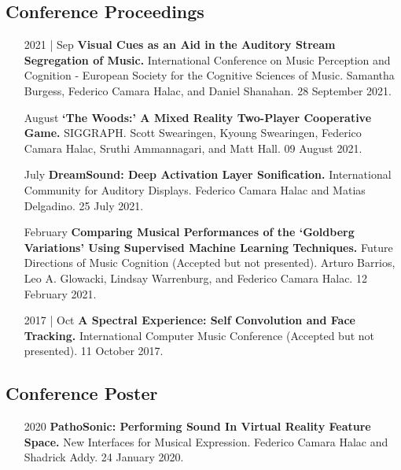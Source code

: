 \documentclass[12pt]{article}%
\begin{document}
\subsection{Conference Proceedings}%
\begin{itemize}[align=parleft,leftmargin=2.25cm,labelwidth=2cm]
\item[2021 | Sep]
\textbf{Visual Cues as an Aid in the Auditory Stream Segregation of Music.}
International Conference on Music Perception and Cognition {-} European Society for the Cognitive Sciences of Music. 
Samantha Burgess, Federico Camara Halac, and Daniel Shanahan. 
28 September 2021.
\end{itemize}%
\begin{itemize}[align=parleft,leftmargin=2.25cm,labelwidth=2cm]
\item[August]
\textbf{`The Woods:' A Mixed Reality Two{-}Player Cooperative Game.}
SIGGRAPH. 
Scott Swearingen, Kyoung Swearingen, Federico Camara Halac, Sruthi Ammannagari, and Matt Hall. 
09 August 2021.
\end{itemize}%
\begin{itemize}[align=parleft,leftmargin=2.25cm,labelwidth=2cm]
\item[July]
\textbf{DreamSound: Deep Activation Layer Sonification.}
International Community for Auditory Displays. 
Federico Camara Halac and Matias Delgadino. 
25 July 2021.
\end{itemize}%
\begin{itemize}[align=parleft,leftmargin=2.25cm,labelwidth=2cm]
\item[February]
\textbf{Comparing Musical Performances of the `Goldberg Variations' Using Supervised Machine Learning Techniques.}
Future Directions of Music Cognition (Accepted but not presented). 
Arturo Barrios, Leo A. Glowacki, Lindsay Warrenburg, and Federico Camara Halac. 
12 February 2021.
\end{itemize}%
\begin{itemize}[align=parleft,leftmargin=2.25cm,labelwidth=2cm]
\item[2017 | Oct]
\textbf{A Spectral Experience: Self Convolution and Face Tracking.}
International Computer Music Conference (Accepted but not presented). 
11 October 2017.
\end{itemize}%
\subsection{Conference Poster}%
\begin{itemize}[align=parleft,leftmargin=2.25cm,labelwidth=2cm]
\item[2020]
\textbf{PathoSonic: Performing Sound In Virtual Reality Feature Space.}
New Interfaces for Musical Expression. 
Federico Camara Halac and Shadrick Addy. 
24 January 2020.
\end{itemize}%
\end{document}
